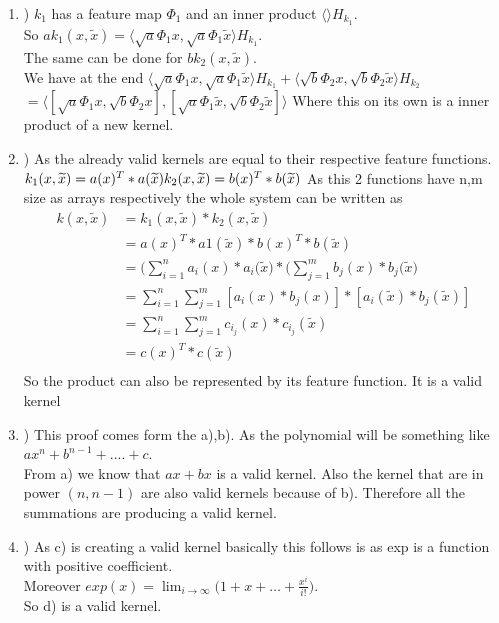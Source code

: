 \begin{enumerate}[label=\alph*]
\item ) $k_1$ has a feature map $\Phi_1$ and an inner product $\langle\rangle H_{k_1}$.\\
So $ak_1(x,\widetilde{x}) = \langle \sqrt{a}\Phi_1{x}, \sqrt{a}\Phi_1{\widetilde{x}} \rangle H_{k_1}$. \\
The same can be done for $bk_2(x,\widetilde{x})$.\\
We have at the end 
$\langle \sqrt{a}\Phi_1{x}, \sqrt{a}\Phi_1{\widetilde{x}} \rangle H_{k_1} + \langle \sqrt{b}\Phi_2{x}, \sqrt{b}\Phi_2{\widetilde{x}} \rangle H_{k_2}$\\
$= \langle [\sqrt{a}\Phi_1{x},\sqrt{b}\Phi_2{x}], [\sqrt{a}\Phi_1{\widetilde{x}},\sqrt{b}\Phi_2{\widetilde{x}}] \rangle$
Where this on its own is a inner product of a new kernel.
\item ) As the already valid kernels are equal to their respective feature functions.
$k_1(x,\widetilde{x}) = a(x)^T*a(\widetilde{x})\\
k_2(x,\widetilde{x}) = b(x)^T*b(\widetilde{x})$
As this 2 functions have n,m size as arrays respectively the whole system can be written as
\begin{align*}
k(x,\widetilde{x}) &= k_1(x,\widetilde{x})*k_2(x,\widetilde{x})\\
		   &= a(x)^T*a1(\widetilde{x}) * b(x)^T*b(\widetilde{x})\\
		   &= \Big( \sum_{i=1}^{n} a_i(x)*a_i(\widetilde{x} \Big)*\Big( \sum_{j=1}^{m} b_j(x)*b_j(\widetilde{x} \Big)\\
		   &= \sum_{i=1}^{n}\sum_{j=1}^{m}[a_i(x)*b_j(x)] * [a_i(\widetilde{x})*b_j(\widetilde{x})]\\
		   &= \sum_{i=1}^{n}\sum_{j=1}^{m} c_{i_j}(x)*c_{i_j}(\widetilde{x})\\
		   &= c(x)^T*c(\widetilde{x})\\
\end{align*}
So the product can also be represented by its feature function. It is a valid kernel
\item ) This proof comes form the a),b). As the polynomial will be something like $ax^n+b^{n-1}+....+c$.\\
From a) we know that $ax+bx$ is a valid kernel. Also the kernel that are in power $(n,n-1)$ are also valid kernels
because of b). Therefore all the summations are producing a valid kernel.
\item ) As c) is creating a valid kernel basically this follows is as exp is a function with positive coefficient.\\
Moreover $exp(x) = \lim_{i \to \infty} \big( 1+x+ \ldots + \frac{x^i}{i!} \big)$.\\
So d) is a valid kernel.
\end{enumerate}
